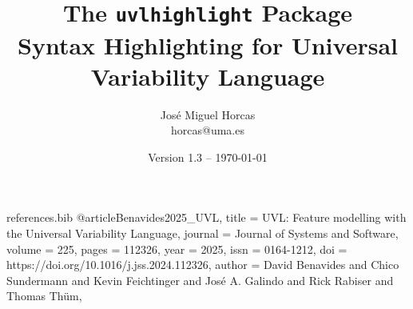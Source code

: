 \begin{filecontents}{references.bib}
@article{Benavides2025_UVL,
    title = {{UVL}: Feature modelling with the Universal Variability Language},
    journal = {Journal of Systems and Software},
    volume = {225},
    pages = {112326},
    year = {2025},
    issn = {0164-1212},
    doi = {https://doi.org/10.1016/j.jss.2024.112326},
    author = {David Benavides and Chico Sundermann and Kevin Feichtinger and José A. Galindo and Rick Rabiser and Thomas Thüm},
}
\end{filecontents}

\documentclass[a4paper,11pt]{article}

%

\usepackage[T1]{fontenc}
\usepackage[utf8]{inputenc}
\usepackage{lmodern}
\usepackage{geometry}
\usepackage{xcolor}
\usepackage{hyperref}
\usepackage{listings}
\usepackage{tcolorbox} %

\usepackage{uvlhighlight}

\geometry{left=2.5cm, right=2.5cm, top=3cm, bottom=3cm}

\title{\textbf{The \texttt{uvlhighlight} Package} \\ \large Syntax Highlighting for Universal Variability Language}
\author{José Miguel Horcas\\horcas@uma.es}
\date{Version 1.3 -- \today}



\maketitle

\begin{abstract}
The \texttt{uvlhighlight} package provides syntax highlighting for the Universal Variability Language (UVL) in \LaTeX. It is based on the listings package and supports all UVL keywords. The package includes multiple visual themes (default, Flamapy, UVLS dark mode, and black \& white) and provides inline commands for semantic highlighting.
It also supports user-defined features' attributes and the inclusion of external .uvl files.
\end{abstract}

